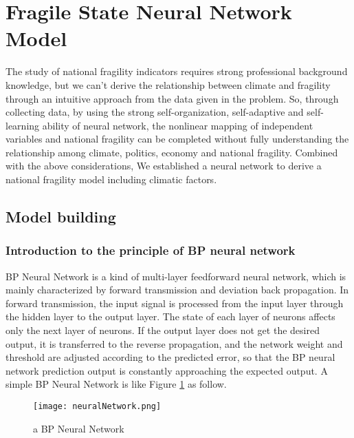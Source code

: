\documentclass{mcmthesis}
\newcommand{\upcite}[1]{\textsuperscript{\textsuperscript{\cite{#1}}}}
\begin{document}





\section{Fragile State Neural Network Model}
The study of national fragility indicators requires strong professional
background knowledge, but we can't derive the relationship between climate
and fragility through an intuitive approach from the data given in the 
problem. So, through collecting data, by using the strong self-organization, 
self-adaptive and self-learning ability of neural network, the nonlinear 
mapping of independent variables and national fragility can be completed 
without fully understanding the relationship among climate, politics, 
economy and national fragility. Combined with the above considerations, 
We established a neural network to derive a national fragility model 
including climatic factors.
\subsection{Model building}
\subsubsection{Introduction to the principle of BP neural network}
BP Neural Network is a kind of multi-layer feedforward neural network, 
which is mainly characterized by forward transmission and deviation back 
propagation. In forward transmission, the input signal is processed from 
the input layer through the hidden layer to the output layer. The state of 
each layer of neurons affects only the next layer of neurons. If the output 
layer does not get the desired output, it is transferred to the reverse 
propagation, and the network weight and threshold are adjusted according 
to the predicted error, so that the BP neural network prediction output 
is constantly approaching the expected output. A simple BP Neural Network 
is like Figure \ref{fig:nn} as follow.\upcite{bib20}
\begin{figure}[h]
\small
\centering
\texttt{[image: neuralNetwork.png]}
\caption{a BP Neural Network} 
\label{fig:nn}
\end{figure}
\end{document}
